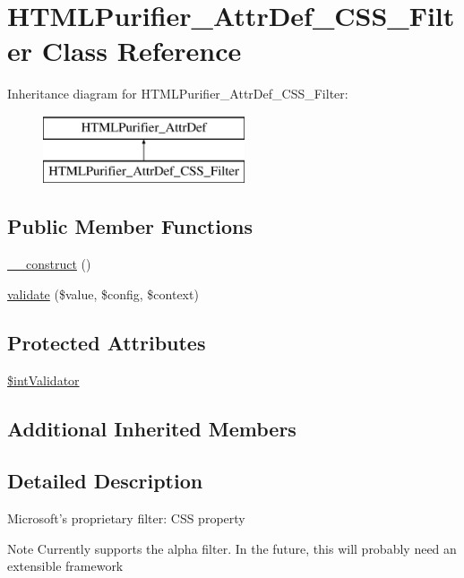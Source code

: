 \hypertarget{classHTMLPurifier__AttrDef__CSS__Filter}{\section{H\+T\+M\+L\+Purifier\+\_\+\+Attr\+Def\+\_\+\+C\+S\+S\+\_\+\+Filter Class Reference}
\label{classHTMLPurifier__AttrDef__CSS__Filter}
}
Inheritance diagram for H\+T\+M\+L\+Purifier\+\_\+\+Attr\+Def\+\_\+\+C\+S\+S\+\_\+\+Filter\+:\begin{figure}[H]
\begin{center}
\leavevmode
\includegraphics[height=2.000000cm]{classHTMLPurifier__AttrDef__CSS__Filter}
\end{center}
\end{figure}
\subsection*{Public Member Functions}
\begin{DoxyCompactItemize}
\item 
\hyperlink{classHTMLPurifier__AttrDef__CSS__Filter_a1378e49320549442863b7469db7e4c10}{\+\_\+\+\_\+construct} ()
\item 
\hyperlink{classHTMLPurifier__AttrDef__CSS__Filter_a8f258367099bd1f1b6b900165e1f5e4d}{validate} (\$value, \$config, \$context)
\end{DoxyCompactItemize}
\subsection*{Protected Attributes}
\begin{DoxyCompactItemize}
\item 
\hyperlink{classHTMLPurifier__AttrDef__CSS__Filter_a3871246e8ca0c94a91efddeb818d45af}{\$int\+Validator}
\end{DoxyCompactItemize}
\subsection*{Additional Inherited Members}


\subsection{Detailed Description}
Microsoft's proprietary filter\+: C\+S\+S property \begin{DoxyNote}{Note}
Currently supports the alpha filter. In the future, this will probably need an extensible framework 
\end{DoxyNote}


